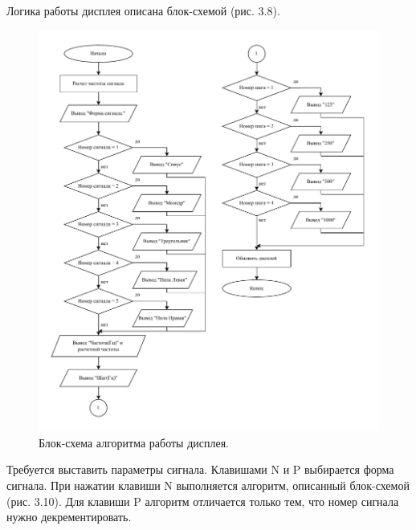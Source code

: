 	Логика работы дисплея описана блок-схемой (рис. 3.8).
	
	\begin{figure}[H]
    \centering
    \includegraphics[width=1\textwidth]{../image/display.pdf}
    \caption{Блок-схема алгоритма работы дисплея.}
	\end{figure}	
	
	Требуется выставить параметры сигнала. Клавишами N и P выбирается форма сигнала. При нажатии клавиши N выполняется алгоритм, описанный блок-схемой (рис. 3.10). Для клавиши P алгоритм отличается только тем, что номер сигнала нужно декрементировать.
	
